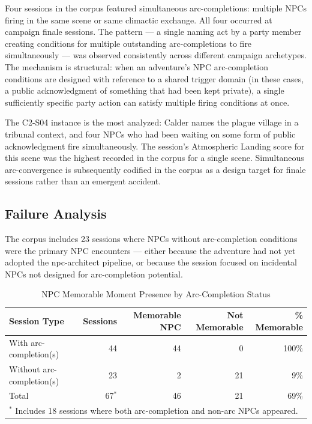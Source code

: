 Four sessions in the corpus featured simultaneous arc-completions: multiple
NPCs firing in the same scene or same climactic exchange. All four occurred
at campaign finale sessions. The pattern --- a single naming act by a party
member creating conditions for multiple outstanding arc-completions to fire
simultaneously --- was observed consistently across different campaign archetypes.
The mechanism is structural: when an adventure's NPC arc-completion conditions
are designed with reference to a shared trigger domain (in these cases, a public
acknowledgment of something that had been kept private), a single sufficiently
specific party action can satisfy multiple firing conditions at once.

The C2-S04 instance is the most analyzed: Calder names the plague village in a
tribunal context, and four NPCs who had been waiting on some form of public
acknowledgment fire simultaneously. The session's Atmospheric Landing score for
this scene was the highest recorded in the corpus for a single scene.
Simultaneous arc-convergence is subsequently codified in the corpus as a design
target for finale sessions rather than an emergent accident.

\subsection{Failure Analysis}

The corpus includes 23 sessions where NPCs without arc-completion conditions were
the primary NPC encounters --- either because the adventure had not yet adopted
the npc-architect pipeline, or because the session focused on incidental NPCs
not designed for arc-completion potential.

\begin{table}[t]
\caption{NPC Memorable Moment Presence by Arc-Completion Status}
\label{tab:failure}
\begin{tabular}{@{}lrrrr@{}}
\toprule
\textbf{Session Type} & \textbf{Sessions} & \textbf{Memorable NPC} &
\textbf{Not Memorable} & \textbf{\% Memorable} \\
\midrule
With arc-completion(s)      & 44 & 44 & 0  & 100\% \\
Without arc-completion(s)   & 23 & 2  & 21 & 9\%   \\
\midrule
Total                       & 67$^{\ast}$ & 46 & 21 & 69\% \\
\bottomrule
\multicolumn{5}{l}{\small $^{\ast}$ Includes 18 sessions where both arc-completion and non-arc NPCs appeared.} \\
\end{tabular}
\end{table}

